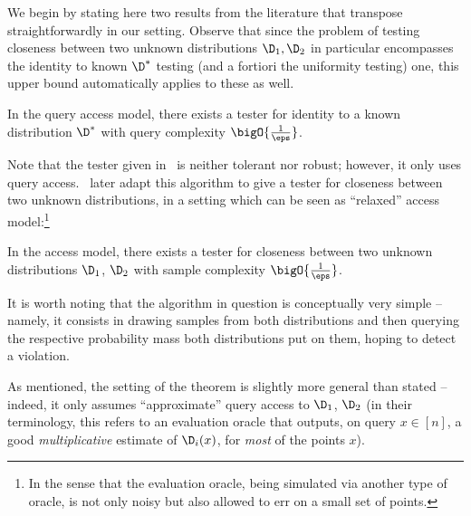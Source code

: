 \noindent We begin by stating here two results from the literature that transpose straightforwardly in our setting. Observe that since the problem of testing closeness between two unknown distributions $\D_1,\D_2$ in particular encompasses the identity to known $\D^\ast$ testing (and a fortiori the uniformity testing) one, this upper bound automatically applies to these as well.
\begin{theorem}[{\cite[Theorem 24]{RS:09}}]\label{theorem:testing:equivalence:dknown:rs09}
In the query access model, there exists a tester for identity to a known distribution $\D^\ast$ with query complexity $\bigO{\frac{1}{\eps}}$.
\end{theorem}
Note that the tester given in~\cite{RS:09} is neither tolerant nor robust; however, it only uses query access.~\cite{CRS:15} later adapt this algorithm to give a tester for closeness between two unknown distributions, in a setting which can be seen as ``relaxed'' \pdfsamp access model:\footnote{In the sense that the evaluation oracle, being simulated via another type of oracle, is not only noisy but also allowed to err on a small set of points.}
\begin{theorem}\label{theorem:testing:equivalence:d1:d2:CRS:15}
In the \pdfsamp access model, there exists a tester for closeness between two unknown distributions $\D_1$, $\D_2$ with sample complexity $\bigO{\frac{1}{\eps}}$.
\end{theorem}
It is worth noting that the algorithm in question is conceptually very simple -- namely, it consists in drawing samples from both distributions and then querying the respective probability mass both distributions put on them, hoping to detect a violation.

\begin{remark}
As mentioned, the setting of the theorem is slightly more general than stated -- indeed, it only assumes ``approximate'' query access to $\D_1$, $\D_2$ (in their terminology, this refers to an evaluation oracle that outputs, on query $x\in[n]$, a good \emph{multiplicative} estimate of $\D_i(x)$, for \emph{most} of the points $x$).\end{remark}

